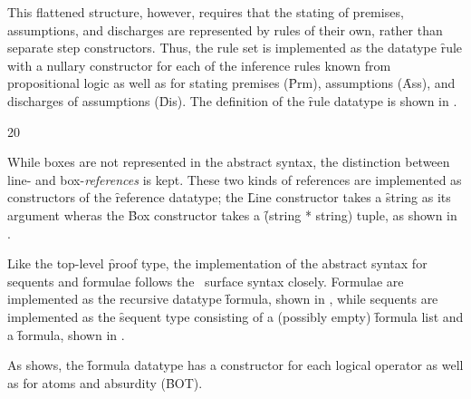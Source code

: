 \documentclass[BA.tex]{subfiles}
\begin{document}
 This flattened structure, however, requires that the stating
 of premises, assumptions, and discharges are represented by rules of their
 own, rather than separate step constructors. Thus, the rule set is 
 implemented as the datatype \f{rule} with a nullary constructor for each
 of the inference rules known from propositional logic as well as for
 stating premises (\f{Prm}), assumptions (\f{Ass}), and discharges of 
 assumptions (\f{Dis}). 
 The definition of the \f{rule} datatype is shown in .

{20}

While boxes are not represented in the abstract syntax, the distinction
 between line- and box-\emph{references} is kept.
 These two kinds of references are implemented as constructors of the 
 \f{reference} datatype; the \f{Line} 
 constructor takes a \f{string} as its argument wheras the \f{Box}
 constructor takes a \f{(string * string)} tuple, as shown in 
 .



Like the top-level \f{proof} type, the implementation of the abstract syntax
 for sequents and formulae follows the \bp\ surface syntax closely.
 Formulae are implemented as the recursive datatype \f{formula}, shown in
 \lst{../Proof.sml38}, while sequents are implemented as the \f{sequent} 
 type consisting of a (possibly empty) \f{formula list} and a \f{formula},
 shown in \lst{../Proof.sml2626}.


 As  shows, the \f{formula} datatype has a
 constructor for each logical
 operator as well as for atoms and absurdity
 (\f{BOT}).

\end{document}
